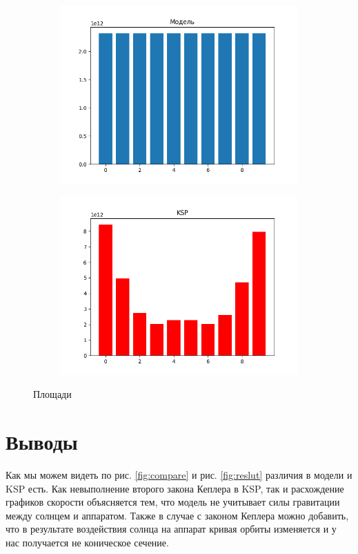 \documentclass{article}
\begin{document}
    \begin{figure}[H]
        \begin{subfigure}{0.5\textwidth}
            \includegraphics[width=1\linewidth]{images/model_bins.png}
        \end{subfigure}
        \begin{subfigure}{0.5\textwidth}
           \includegraphics[width=1\linewidth]{images/ksp_bins.png}
        \end{subfigure}
        \label{fig:areas}
        \caption{Площади}
    \end{figure}
    \section{Выводы}
    Как мы можем видеть по рис. \ref{fig:compare} и рис. \ref{fig:reslut} различия в модели и KSP есть. Как невыполнение второго закона Кеплера в KSP, так и расхождение графиков скорости объясняется тем, что модель не учитывает силы гравитации между солнцем и аппаратом. Также в случае с законом Кеплера можно добавить, что в результате воздействия солнца на аппарат кривая орбиты изменяется и у нас получается не коническое сечение. 
    \newpage
    \nocite{*}
    \printbibliography
\end{document}

